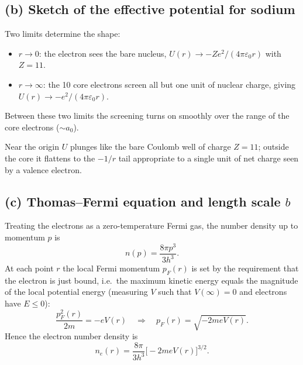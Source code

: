 \documentclass[11pt]{article}
\begin{document}
\subsection*{(b) Sketch of the effective potential for sodium}

Two limits determine the shape:
\begin{itemize}
    \item $r\to 0$: the electron sees the bare nucleus, $U(r)\to -Ze^2/(4\pi\varepsilon_0 r)$ with $Z=11$.
    \item $r\to\infty$: the 10 core electrons screen all but one unit of nuclear charge, giving $U(r)\to -e^2/(4\pi\varepsilon_0 r)$.
\end{itemize}
Between these two limits the screening turns on smoothly over the range of the core electrons ($\sim a_0$).

\begin{center}
\end{center}
Near the origin $U$ plunges like the bare Coulomb well of charge $Z=11$; outside the core it flattens to the $-1/r$ tail appropriate to a single unit of net charge seen by a valence electron.

\subsection*{(c) Thomas--Fermi equation and length scale $b$}

Treating the electrons as a zero-temperature Fermi gas, the number density up to momentum $p$ is
\begin{equation*}
    n(p) = \frac{8\pi p^3}{3h^3}.
\end{equation*}
At each point $r$ the local Fermi momentum $p_F(r)$ is set by the requirement that the electron is just bound, i.e.\ the maximum kinetic energy equals the magnitude of the local potential energy (measuring $V$ such that $V(\infty)=0$ and electrons have $E\le 0$):
\begin{equation*}
    \frac{p_F^2(r)}{2m} = -eV(r) \quad\Longrightarrow\quad p_F(r)=\sqrt{-2meV(r)}.
\end{equation*}
Hence the electron number density is
\begin{equation}
    n_e(r) = \frac{8\pi}{3h^3}\bigl[-2meV(r)\bigr]^{3/2}. \label{eq:ne}
\end{equation}
\end{document}
